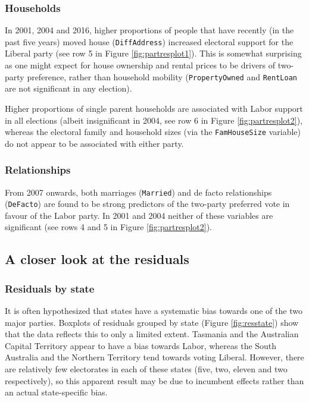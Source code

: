 \documentclass[times, doublespace]{anzsauth}
\begin{document}
\hypertarget{households}{%
\subsubsection*{Households}\label{households}}

In 2001, 2004 and 2016, higher proportions of people that have recently (in the past five years) moved house (\texttt{DiffAddress}) increased electoral support for the Liberal party (see row 5 in Figure \ref{fig:partresplot1}). This is somewhat surprising as one might expect for house ownership and rental prices to be drivers of two-party preference, rather than household mobility (\texttt{PropertyOwned} and \texttt{RentLoan} are not significant in any election).

Higher proportions of single parent households are associated with Labor support in all elections (albeit insignificant in 2004, see row 6 in Figure \ref{fig:partresplot2}), whereas the electoral family and household sizes (via the \texttt{FamHouseSize} variable) do not appear to be associated with either party.

\hypertarget{relationships}{%
\subsubsection*{Relationships}\label{relationships}}

From 2007 onwards, both marriages (\texttt{Married}) and de facto relationships (\texttt{DeFacto}) are found to be strong predictors of the two-party preferred vote in favour of the Labor party. In 2001 and 2004 neither of these variables are significant (see rows 4 and 5 in Figure \ref{fig:partresplot2}).

\hypertarget{a-closer-look-at-the-residuals}{%
\subsection{A closer look at the residuals}\label{a-closer-look-at-the-residuals}}

\hypertarget{residuals-by-state}{%
\subsubsection*{Residuals by state}\label{residuals-by-state}}

It is often hypothesized that states have a systematic bias towards one of the two major parties. Boxplots of residuals grouped by state (Figure \ref{fig:resstate}) show that the data reflects this to only a limited extent. Tasmania and the Australian Capital Territory appear to have a bias towards Labor, whereas the South Australia and the Northern Territory tend towards voting Liberal. However, there are relatively few electorates in each of these states (five, two, eleven and two respectively), so this apparent result may be due to incumbent effects rather than an actual state-specific bias.
\end{document}
